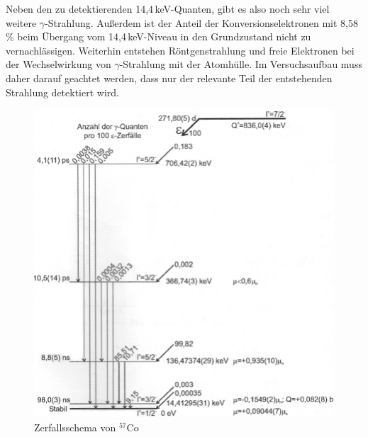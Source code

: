 	Neben den zu detektierenden 14,4\,keV-Quanten, gibt es also noch sehr viel weitere $\gamma$-Strahlung. Außerdem ist der Anteil der Konversionselektronen mit 8,58\,\% beim Übergang vom 14,4\,keV-Niveau in den Grundzustand nicht zu vernachlässigen. Weiterhin entstehen Röntgenstrahlung und freie Elektronen bei der Wechselwirkung von $\gamma$-Strahlung mit der Atomhülle. Im Versuchsaufbau muss daher darauf geachtet werden, dass nur der relevante Teil der entstehenden Strahlung detektiert wird.    
    
	\begin{figure}[H]
		\centering
		\includegraphics[width=0.9\linewidth]{img/Zerfallsschema}
		\caption{Zerfallsschema von $^{57}$Co \cite{wwu}}
		\label{fig:zerfallsschema}
	\end{figure}
